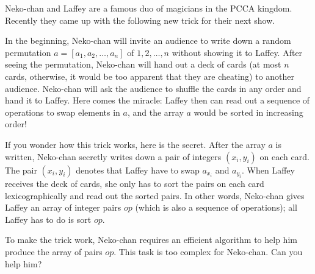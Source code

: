 Neko-chan and Laffey are a famous duo of magicians in the PCCA kingdom.
Recently they came up with the following new trick for their next show.

In the beginning, Neko-chan will invite an audience to write down a random permutation $a=[a_1,a_2,\ldots,a_n]$ of $1,2,\ldots,n$ without showing it to Laffey.
After seeing the permutation, Neko-chan will hand out a deck of cards (at most $n$ cards, otherwise, it would be too apparent that they are cheating) to another audience.
Neko-chan will ask the audience to shuffle the cards in any order and hand it to Laffey.
Here comes the miracle: Laffey then can read out a sequence of operations to swap elements in $a$, and the array $a$ would be sorted in increasing order!

If you wonder how this trick works, here is the secret.
After the array $a$ is written, Neko-chan secretly writes down a pair of integers $(x_i,y_i)$ on each card.
The pair $(x_i,y_i)$ denotes that Laffey have to swap $a_{x_i}$ and $a_{y_i}$.
When Laffey receives the deck of cards, she only has to sort the pairs on each card lexicographically and read out the sorted pairs.
In other words, Neko-chan gives Laffey an array of integer pairs $op$ (which is also a sequence of operations); all Laffey has to do is sort $op$.

To make the trick work, Neko-chan requires an efficient algorithm to help him produce the array of pairs $op$.
This task is too complex for Neko-chan. Can you help him?